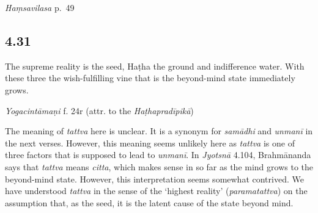 \begin{ekdosis}
\begin{testimonia}[hp04_030]
\emph{Haṃsavilasa} p.~49
\begin{versinnote}
\end{versinnote}
\end{testimonia}


\subsection*{4.31}
\begin{translation}[hp04_031]
The supreme reality is the seed, Haṭha the ground and indifference water. With these three the wish-fulfilling vine that is the beyond-mind state immediately grows.
\end{translation}



\begin{testimonia}[hp04_031]
\emph{Yogacintāmaṇi} f. 24r (attr. to the \emph{Haṭhapradīpikā})
\begin{versinnote}
\end{versinnote}
\end{testimonia}

\begin{philcomm}[hp04_031]
The meaning of \emph{tattva} here is unclear. It is a synonym for \emph{samādhi} and \emph{unmanī} in the next verses. However, this meaning seems unlikely here as \emph{tattva} is one of three factors that is supposed to lead to \emph{unmanī}. In \emph{Jyotsnā} 4.104, Brahmānanda says that \emph{tattva} means \emph{citta}, which makes sense in so far as the mind grows to the beyond-mind state. However, this interpretation seems somewhat contrived. We have understood \emph{tattva} in the sense of the `highest reality' (\emph{paramatattva}) on the assumption that, as the seed, it is the latent cause of the state beyond mind.


\end{philcomm}
\end{ekdosis}
